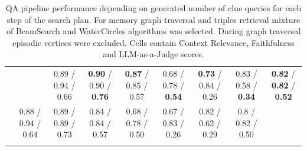 \begin{table}[th!]
{\begin{tabular}{|cc|c|c|c|c|c|c||c|}
   \hhline{|-|~|-|-|-|-|-|-||-|}
    \multicolumn{1}{|c|}{8} &  & \multicolumn{1}{c|}{0.89 / 0.94 / 0.66} & \multicolumn{1}{c|}{\cellcolor{grannysmithapple}\textbf{0.90} / 0.90 / \textbf{0.76}} & \multicolumn{1}{c|}{\textbf{0.87} / 0.85 / 0.57} & \multicolumn{1}{c|}{\cellcolor{grannysmithapple} 0.68 / 0.78 / \textbf{0.54}} & \multicolumn{1}{c|}{\textbf{0.73} / 0.84 / 0.26} & \cellcolor{grannysmithapple} 0.83 / 0.58 / \textbf{0.34} & \cellcolor{grannysmithapple} \textbf{0.82} / \textbf{0.82} / \textbf{0.52} \\ 
    \hhline{========::=}
    \multicolumn{2}{|c|}{Mean} & \multicolumn{1}{c|}{0.88 / 0.94 / 0.64} & \multicolumn{1}{c|}{0.89 / 0.89 / 0.73} & \multicolumn{1}{c|}{0.84 / 0.84 / 0.57} & \multicolumn{1}{c|}{0.68 / 0.78 / 0.50} & \multicolumn{1}{c|}{0.67 / 0.83 / 0.26} & 0.82 / 0.62 / 0.29 & 0.8 / 0.82 / 0.50 \\ 
    \hhline{|--|-|-|-|-|-|-||-|}
    \end{tabular}}
    \renewcommand{\arraystretch}{1}
    \caption{QA pipeline performance depending on generated number of clue queries for each step of the search plan. For memory graph traversal and triples retrieval mixture of BeamSearch and WaterCircles algorithms was selected. During graph traversal episodic vertices were excluded. Cells contain Context Relevance, Faithfulness and LLM-as-a-Judge scores.}
	\label{tab:bswc_woe_maxcluequeries_ablation}
\end{table}

